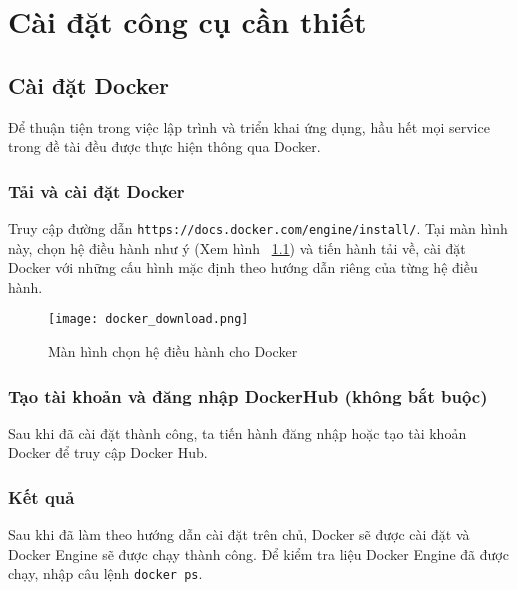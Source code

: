 \chapter{Cài đặt công cụ cần thiết}
\label{Chapter1}

\section{Cài đặt Docker}
Để thuận tiện trong việc lập trình và triển khai ứng dụng, hầu hết mọi service trong đề tài đều được thực hiện thông qua Docker.
        \subsection{Tải và cài đặt Docker}
    Truy cập đường dẫn \texttt{https://docs.docker.com/engine/install/}. Tại màn hình này, chọn hệ điều hành như ý (Xem hình ~\ref{fig:docker_download}) và tiến hành tải về, cài đặt Docker với những cấu hình mặc định theo hướng dẫn riêng của từng hệ điều hành.
    \begin{figure}
            \centering
            \texttt{[image: docker\_download.png]}
            \caption{Màn hình chọn hệ điều hành cho Docker}
            \label{fig:docker_download}
    \end{figure}

    \subsection{Tạo tài khoản và đăng nhập DockerHub (không bắt buộc)}
    Sau khi đã cài đặt thành công, ta tiến hành đăng nhập hoặc tạo tài khoản Docker để truy cập Docker Hub.
    \subsection{Kết quả}
    Sau khi đã làm theo hướng dẫn cài đặt trên chủ, Docker sẽ được cài đặt và Docker Engine sẽ được chạy thành công. Để kiểm tra liệu Docker Engine đã được chạy, nhập câu lệnh \texttt{docker ps}.
